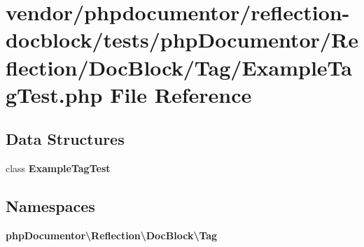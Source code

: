 \section{vendor/phpdocumentor/reflection-\/docblock/tests/php\+Documentor/\+Reflection/\+Doc\+Block/\+Tag/\+Example\+Tag\+Test.php File Reference}
\label{_example_tag_test_8php}
\subsection*{Data Structures}
\begin{DoxyCompactItemize}
\item 
class {\bf Example\+Tag\+Test}
\end{DoxyCompactItemize}
\subsection*{Namespaces}
\begin{DoxyCompactItemize}
\item 
 {\bf php\+Documentor\textbackslash{}\+Reflection\textbackslash{}\+Doc\+Block\textbackslash{}\+Tag}
\end{DoxyCompactItemize}

